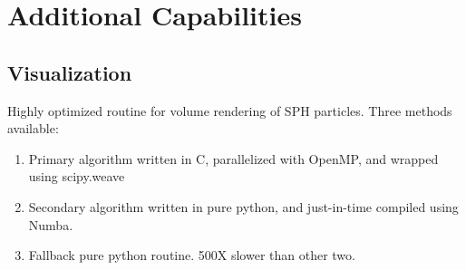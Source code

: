 \section{Additional Capabilities}
\label{extras}
\subsection{Visualization}
\label{visualization}

Highly optimized routine for volume rendering of SPH particles.  Three methods available:
\begin{enumerate}
\item Primary algorithm written in C, parallelized with OpenMP, and wrapped using scipy.weave
\item Secondary algorithm written in pure python, and just-in-time compiled using Numba.
\item Fallback pure python routine.  500X slower than other two.
\end{enumerate}